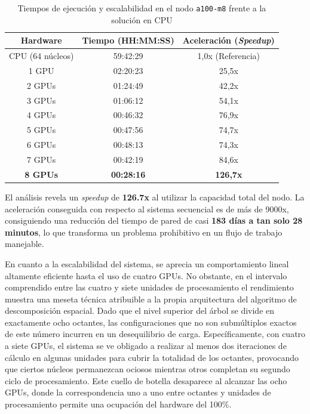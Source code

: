 \begin{table}[H]
    \centering
    \begin{tabular}{|c|c|c|}
        \hline
        \textbf{Hardware} & \textbf{Tiempo (HH:MM:SS)} & \textbf{Aceleración (\textit{Speedup})} \\ \hline
        CPU (64 núcleos)  & 59:42:29                   & 1,0x (Referencia)                       \\ \hline
        1 GPU             & 02:20:23                   & 25,5x                                   \\ \hline
        2 GPUs            & 01:24:49                   & 42,2x                                   \\ \hline
        3 GPUs            & 01:06:12                   & 54,1x                                   \\ \hline
        4 GPUs            & 00:46:32                   & 76,9x                                   \\ \hline
        5 GPUs            & 00:47:56                   & 74,7x                                   \\ \hline
        6 GPUs            & 00:48:13                   & 74,3x                                   \\ \hline
        7 GPUs            & 00:42:19                   & 84,6x                                   \\ \hline
        \textbf{8 GPUs}   & \textbf{00:28:16}          & \textbf{126,7x}                         \\ \hline
    \end{tabular}
    \caption{Tiempos de ejecución y escalabilidad en el nodo \texttt{a100-m8} frente a la solución en CPU}
    \label{tab:rendimiento_gpu}
\end{table}

El análisis revela un \textit{speedup} de \textbf{126.7x} al utilizar la capacidad total del nodo.
La aceleración conseguida con respecto al sistema secuencial es de más de 9000x, consiguiendo una reducción del tiempo de pared de casi \textbf{183 días a tan solo 28 minutos}, lo que transforma un problema prohibitivo en un flujo de trabajo manejable.

En cuanto a la escalabilidad del sistema, se aprecia un comportamiento lineal altamente eficiente hasta el uso de cuatro GPUs.
No obstante, en el intervalo comprendido entre las cuatro y siete unidades de procesamiento el rendimiento muestra una meseta técnica atribuible a la propia arquitectura del algoritmo de descomposición espacial.
Dado que el nivel superior del árbol se divide en exactamente ocho octantes, las configuraciones que no son submúltiplos exactos de este número incurren en un desequilibrio de carga.
Específicamente, con cuatro a siete GPUs, el sistema se ve obligado a realizar al menos dos iteraciones de cálculo en algunas unidades para cubrir la totalidad de los octantes, provocando que ciertos núcleos permanezcan ociosos mientras otros completan su segundo ciclo de procesamiento.
Este cuello de botella desaparece al alcanzar las ocho GPUs, donde la correspondencia uno a uno entre octantes y unidades de procesamiento permite una ocupación del hardware del 100\%.

